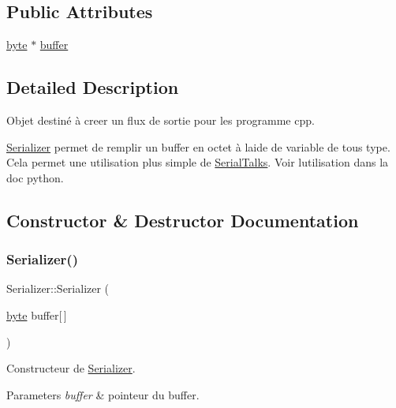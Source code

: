 \subsection*{Public Attributes}
\begin{DoxyCompactItemize}
\item 
\hyperlink{serialutils_8h_a0c8186d9b9b7880309c27230bbb5e69d}{byte} $\ast$ \hyperlink{struct_serializer_a2c1edbc67c09dcfffe63194038fd9566}{buffer}
\end{DoxyCompactItemize}


\subsection{Detailed Description}
Objet destiné à creer un flux de sortie pour les programme cpp. 

\hyperlink{struct_serializer}{Serializer} permet de remplir un buffer en octet à l\textquotesingle{}aide de variable de tous type. Cela permet une utilisation plus simple de \hyperlink{class_serial_talks}{Serial\+Talks}. Voir l\textquotesingle{}utilisation dans la doc python. 

\subsection{Constructor \& Destructor Documentation}
\mbox{\label{struct_serializer_aff15a74ed17c990475261e4d1319ca7a}} 
\subsubsection{\texorpdfstring{Serializer()}{Serializer()}}
{\footnotesize\ttfamily Serializer\+::\+Serializer (\begin{DoxyParamCaption}\item[{\hyperlink{serialutils_8h_a0c8186d9b9b7880309c27230bbb5e69d}{byte}}]{buffer\mbox{[}$\,$\mbox{]} }\end{DoxyParamCaption})\hspace{0.3cm}{\ttfamily [inline]}}



Constructeur de \hyperlink{struct_serializer}{Serializer}. 


\begin{DoxyParams}{Parameters}
{\em buffer} & pointeur du buffer. \\
\hline
\end{DoxyParams}



